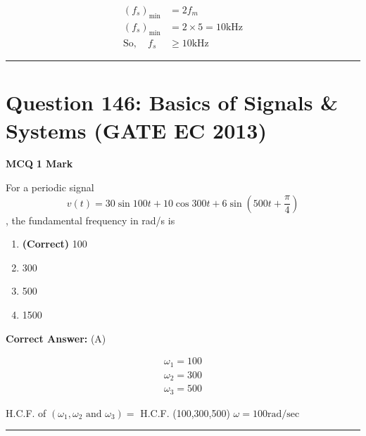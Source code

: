 \documentclass[11pt,a4paper]{article}
\begin{document}
\begin{tcolorbox}[solbox, title=Detailed Solution -- Question 145]
\[
\begin{aligned} \left(f_{s}\right)_{\min } &=2 f_{m} \\ \left(f_{s}\right)_{\min } &=2 \times 5=10 \mathrm{kHz} \\ \mathrm{So}, \quad f_{s} & \geq 10 \mathrm{kHz} \end{aligned}
\]
\end{tcolorbox}

\vspace{1.5em}
\hrule
\vspace{1.5em}

\section*{Question 146: Basics of Signals \& Systems (GATE EC 2013)}
\noindent \textbf{\color{primary}MCQ} \hfill \textbf{\color{secondary}1 Mark}


\noindent For a periodic signal 
\[
v\left ( t \right )=30\sin 100t+10\cos 300t+6\sin \left ( 500t+\frac{\pi }{4} \right )
\]
, the fundamental frequency in rad/s is


\begin{enumerate}[label=(\Alph*)]
    \item \textbf{(Correct)} 100
    \item 300
    \item 500
    \item 1500
\end{enumerate}

\noindent \textbf{Correct Answer:} (A)

\begin{tcolorbox}[solbox, title=Detailed Solution -- Question 146]
\[
\begin{array}{l} \omega_{1}=100 \\ \omega_{2}=300 \\ \omega_{3}=500 \end{array}
\]

 H.C.F. of $\left(\omega_{1}, \omega_{2} \text { and } \omega_{3}\right)=$ H.C.F. (100,300,500) 
$\omega=100 \mathrm{rad} / \mathrm{sec}$
\end{tcolorbox}

\vspace{1.5em}
\hrule
\vspace{1.5em}
\end{document}
